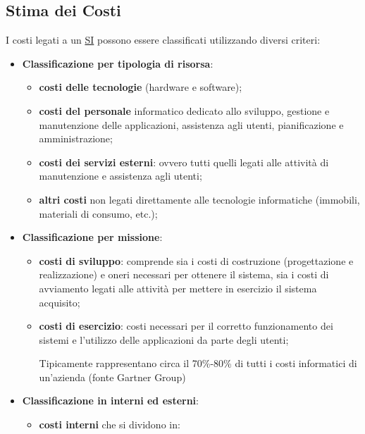 \subsection{Stima dei Costi}\label{sub:ftt_stima_dei_costi} %
I costi legati a un \hyperref[sub:il_sistema_informativo]{SI} possono essere classificati utilizzando diversi criteri:
\begin{itemize}
    \item \textbf{Classificazione per tipologia di risorsa}:
        \begin{itemize}
            \item \textbf{costi delle tecnologie} (hardware e software);
            \item \textbf{costi del personale} informatico dedicato allo sviluppo, gestione e manutenzione delle applicazioni, assistenza agli utenti, pianificazione e amministrazione;
            \item \textbf{costi dei servizi esterni}: ovvero tutti quelli legati alle attività di manutenzione e assistenza agli utenti;
            \item \textbf{altri costi} non legati direttamente alle tecnologie informatiche (immobili, materiali di consumo, etc.);
        \end{itemize}
    \item \textbf{Classificazione per missione}:
        \begin{itemize}
            \item \textbf{costi di sviluppo}: comprende sia i costi di costruzione (progettazione e realizzazione) e oneri necessari per ottenere il sistema, sia i costi di avviamento legati alle attività per mettere in esercizio il sistema acquisito;
            \item \textbf{costi di esercizio}: costi necessari per il corretto funzionamento dei sistemi e l'utilizzo delle applicazioni da parte degli utenti;
                \begin{note}
                    Tipicamente rappresentano circa il 70\%-80\% di tutti i costi informatici di un'azienda (fonte Gartner Group)
                \end{note}
        \end{itemize}
    \item \textbf{Classificazione in interni ed esterni}:
        \begin{itemize}
            \item \textbf{costi interni} che si dividono in:
                \begin{itemize}

\end{itemize}
\end{itemize}
\end{itemize}
